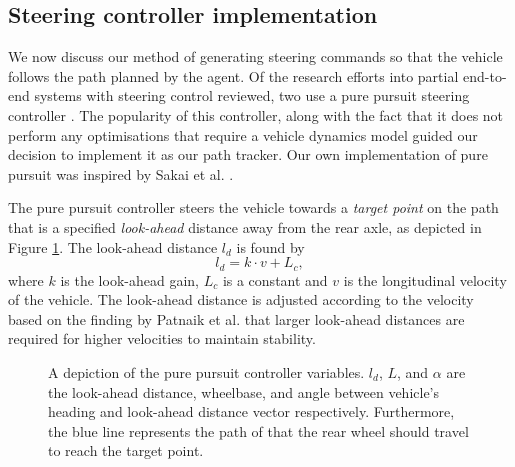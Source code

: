 

\subsection{Steering controller implementation}\label{sec:steer_controller_implementation}
We now discuss our method of generating steering commands so that the vehicle follows the path planned by the agent.
Of the research efforts into partial end-to-end systems with steering control reviewed, two use a pure pursuit steering controller \cite{Evans2021b, Weiss2020}.
The popularity of this controller, along with the fact that it does not perform any optimisations that require a vehicle dynamics model guided our decision to implement it as our path tracker.
Our own implementation of pure pursuit was inspired by Sakai et al. \cite{Sakai2018}.

The pure pursuit controller steers the vehicle towards a \emph{target point} on the path that is a specified \emph{look-ahead} distance away from the rear axle, as depicted in Figure \ref{fig:pure_pursuit}.
The look-ahead distance $l_{d}$ is found by 
\begin{equation}
    l_d = k \cdot v + L_{c},
\end{equation}
where $k$ is the look-ahead gain, $L_{c}$ is a constant and $v$ is the longitudinal velocity of the vehicle. 
The look-ahead distance is adjusted according to the velocity based on the finding by Patnaik et al. \cite{Patnaik2020} that larger look-ahead distances are required for higher velocities to maintain stability.

\begin{figure}[htb!]
    \centering
    
    \caption[A depiction of the pure pursuit controller variables]{A depiction of the pure pursuit controller variables. $l_d$, $L$, and $\alpha$ are the look-ahead distance, wheelbase, and angle between vehicle's heading and look-ahead distance vector respectively. Furthermore, the blue line represents the path of that the rear wheel should travel to reach the target point.}
    \label{fig:pure_pursuit}
\end{figure}

